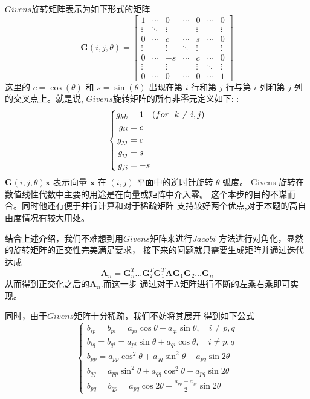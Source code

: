 \documentclass[11pt, a4paper, oneside]{ctexart}
\begin{document}
{{{$Givens$旋转矩阵表示为如下形式的矩阵
$$
\boldsymbol G(i, j, \theta)=\left[\begin{array}{ccccccc}
1 & \cdots & 0 & \cdots & 0 & \cdots & 0 \\
\vdots & \ddots & \vdots & & \vdots & & \vdots \\
0 & \cdots & c & \cdots & s & \cdots & 0 \\
\vdots & & \vdots & \ddots & \vdots & & \vdots \\
0 & \cdots & -s & \cdots & c & \cdots & 0 \\
\vdots & & \vdots & & \vdots & \ddots & \vdots \\
0 & \cdots & 0 & \cdots & 0 & \cdots & 1
\end{array}\right]
$$
这里的 $c=\cos (\theta)$ 和 $s=\sin (\theta)$ 出现在第 $i$ 行和第 $j$ 行与第 $i$ 列和第 $j$ 列的交叉点上。就是说, $Givens$旋转矩阵的所有非零元定义如下: :
$$
    \left\{
        \begin{aligned}
            g_{k k} &=1 \quad \text ({ for \ \ } k \neq i, j) \\
            g_{i i} &=c \\
            g_{j j} &=c \\
            g_{i j} &=s \\
            g_{j i} &=-s
        \end{aligned}
        \right.
$$
$\boldsymbol G(i, j, \theta) \boldsymbol x$  表示向量 $\boldsymbol{x}$ 在 $(i, j)$ 平面中的逆时针旋转 $\theta$ 弧度。
Givens 旋转在数值线性代数中主要的用途是在向量或矩阵中介入零。
这个本步的目的不谋而合。同时他还有便于并行计算和对于稀疏矩阵
支持较好两个优点,对于本题的高自由度情况有较大用处。

结合上述介绍，我们不难想到用$Givens$矩阵来进行$Jacobi$
方法进行对角化，显然的旋转矩阵的正交性完美满足要求，
接下来的问题就只需要生成矩阵并通过迭代达成
$$\boldsymbol {A} _n=\boldsymbol G_n^T \dots\boldsymbol G_2^T \boldsymbol G_1^T 
\boldsymbol {A} 
\boldsymbol G_1\boldsymbol G_2\dots \boldsymbol G_n$$
从而得到正交化之后的$\boldsymbol A_n$.而这一步
通过对于A矩阵进行不断的左乘右乘即可实现。

同时，由于$Givens$矩阵十分稀疏，我们不妨将其展开
得到如下公式
$$
    \left\{\begin{array}{l}
    	b_{i p}=b_{p i}=a_{p i} \cos \theta-a_{q i} \sin \theta, \quad i \neq p, q \\
    	b_{i q}=b_{q i}=a_{p i} \sin \theta+a_{q i} \cos \theta, \quad i \neq p, q \\
    	b_{p p}=a_{p p} \cos ^{2} \theta+a_{q q} \sin ^{2} \theta-a_{p q} \sin 2 \theta \\
    	b_{q q}=a_{p p} \sin ^{2} \theta+a_{q q} \cos ^{2} \theta+a_{p q} \sin 2 \theta \\
    	b_{p q}=b_{q p}=a_{p q} \cos 2 \theta+\frac{a_{p p}-a_{q q}}{2} \sin 2 \theta
    \end{array}\right.
    $$

}}}
\end{document}
